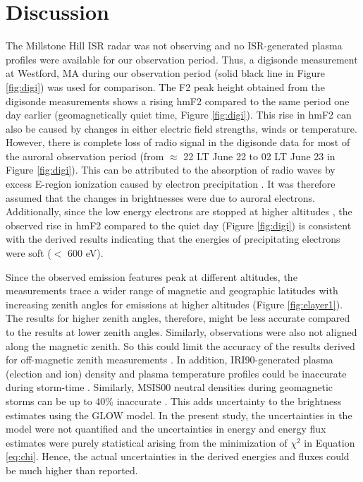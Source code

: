 \documentclass[crop=false,class=mitthesis,oneside,font=12pt]{standalone}
\begin{document}

\section{Discussion}
The Millstone Hill ISR radar was not observing and no ISR-generated plasma profiles were available for our observation period. Thus, a digisonde \citep{giro} measurement at Westford, MA during our observation period (solid black line in Figure \ref{fig:digi}) was used for comparison. The F2 peak height obtained from the digisonde measurements shows a rising hmF2 compared to the same period one day earlier (geomagnetically quiet time, Figure \ref{fig:digi}). This rise in hmF2 can also be caused by changes in either electric field strengths, winds or temperature. However, there is complete loss of radio signal in the digisonde data for most of the auroral observation period (from $\approx$ 22 LT June 22 to 02 LT June 23 in Figure \ref{fig:digi}). This can be attributed to the absorption of radio waves by excess E-region ionization caused by electron precipitation \citep{pallamraju_2011}. It was therefore assumed that the changes in brightnesses were due to auroral electrons. Additionally, since the low energy electrons are stopped at higher altitudes \citep{rees_1963}, the observed rise in
hmF2 compared to the quiet day (Figure \ref{fig:digi}) is consistent with the derived results indicating that the energies of precipitating electrons were soft ($<$ 600 eV).

Since the observed emission features peak at different altitudes, the measurements trace a wider range of magnetic and geographic latitudes with increasing zenith angles for emissions at higher altitudes (Figure \ref{fig:elayer1}). The results for higher zenith angles, therefore, might be less accurate compared to the results at lower zenith angles. Similarly, observations were also not aligned along the magnetic zenith. So this could limit the accuracy of the results derived for off-magnetic zenith measurements \citep{grubbs_multi_spec}. In addition, IRI90-generated plasma (election and ion) density and plasma temperature profiles could be inaccurate during storm-time \citep{iri_storm}. Similarly, MSIS00 neutral densities during geomagnetic storms can be up to 40\% inaccurate \citep{fang_variations_2012}. This adds uncertainty to the brightness estimates using the GLOW model. In the present study, the uncertainties in the model were not quantified and the uncertainties in energy and energy flux estimates were purely statistical arising from the minimization of $\chi^2$ in Equation \ref{eq:chi}. Hence, the actual uncertainties in the derived energies and fluxes could be much higher than reported.    
\end{document}
